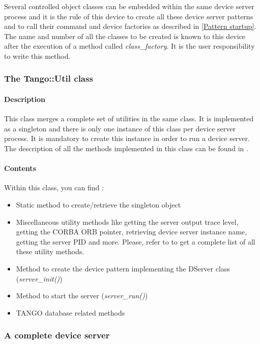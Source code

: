 Several controlled object classes can be embedded within the same
device server process and it is the rule of this device to create
all these device server patterns and to call their command and device
factories as described in \ref{Pattern startup}. The name and number
of all the classes to be created is known to this device after the
execution of a method called \emph{class\_factory}.
It is the user responsibility to write this method.


\subsubsection{The Tango::Util class}


\paragraph{Description}

This class merges a complete set of utilities in the same class. It
is implemented as a singleton and there is only
one instance of this class per device server process. It is mandatory
to create this instance in order to run a device server. The description
of all the methods implemented in this class can be found in \cite{TANGO_ref_man}.


\paragraph{Contents}

Within this class, you can find :
\begin{itemize}
\item Static method to create/retrieve the singleton object
\item Miscellaneous utility methods like getting the server output trace
level, getting the CORBA ORB pointer, retrieving device
server instance name, getting the server PID and more. Please, refer
to \cite{TANGO_ref_man} to get a complete list of all these utility
methods.
\item Method to create the device pattern implementing the DServer class
(\emph{server\_init()})
\item Method to start the server (\emph{server\_run()})
\item TANGO database related methods
\end{itemize}

\subsubsection{A complete device server}

